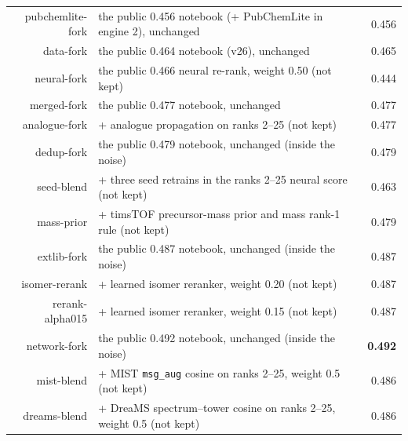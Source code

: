 \documentclass[11pt]{article}
\begin{document}
\begin{center}
\begin{tabular}{rlr}
pubchemlite-fork & the public 0.456 notebook (+ PubChemLite in engine 2), unchanged & 0.456 \\
data-fork & the public 0.464 notebook (v26), unchanged & 0.465 \\
neural-fork & the public 0.466 neural re-rank, weight 0.50 (not kept) & 0.444 \\
merged-fork & the public 0.477 notebook, unchanged & 0.477 \\
analogue-fork & + analogue propagation on ranks 2--25 (not kept) & 0.477 \\
dedup-fork & the public 0.479 notebook, unchanged (inside the noise) & 0.479 \\
seed-blend & + three seed retrains in the ranks 2--25 neural score (not kept) & 0.463 \\
mass-prior & + timsTOF precursor-mass prior and mass rank-1 rule (not kept) & 0.479 \\
extlib-fork & the public 0.487 notebook, unchanged (inside the noise) & 0.487 \\
isomer-rerank & + learned isomer reranker, weight 0.20 (not kept) & 0.487 \\
rerank-alpha015 & + learned isomer reranker, weight 0.15 (not kept) & 0.487 \\
network-fork & the public 0.492 notebook, unchanged (inside the noise) & \textbf{0.492} \\
mist-blend & + MIST \texttt{msg\_aug} cosine on ranks 2--25, weight 0.5 (not kept) & 0.486 \\
dreams-blend & + DreaMS spectrum--tower cosine on ranks 2--25, weight 0.5 (not kept) & 0.486 \\
\bottomrule
\end{tabular}
\end{center}
\end{document}
